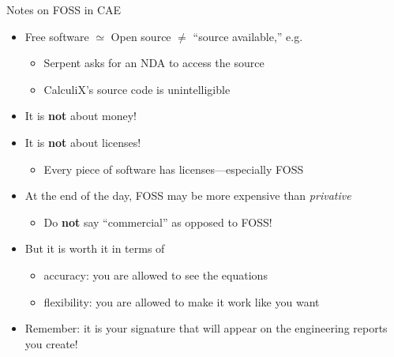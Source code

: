 \documentclass[
  ignorenonframetext,
  aspectratio=169,
]{beamer}
\providecommand{\tightlist}{%
  \setlength{\itemsep}{0pt}\setlength{\parskip}{0pt}}
\begin{document}
\begin{frame}{Notes on FOSS in CAE}
\protect\hypertarget{notes-on-foss-in-cae}{}
\begin{itemize}
\tightlist
\item
  Free software \(\simeq\) Open source \(\neq\) ``source available,''
  e.g.

  \begin{itemize}
  \tightlist
  \item
    Serpent asks for an NDA to access the source
  \item
    CalculiX's source code is unintelligible
  \end{itemize}
\item
  It is \textbf{not} about money!
\item
  It is \textbf{not} about licenses!

  \begin{itemize}
  \tightlist
  \item
    Every piece of software has licenses---especially FOSS
  \end{itemize}
\end{itemize}
\end{frame}

\begin{frame}
\begin{itemize}
\tightlist
\item
  At the end of the day, FOSS may be more expensive than
  \emph{privative}

  \begin{itemize}
  \tightlist
  \item
    Do \textbf{not} say ``commercial'' as opposed to FOSS!
  \end{itemize}
\item
  But it is worth it in terms of

  \begin{itemize}
  \tightlist
  \item
    accuracy: you are allowed to see the equations
  \item
    flexibility: you are allowed to make it work like you want
  \end{itemize}
\end{itemize}
\end{frame}

\begin{frame}
\begin{itemize}
\tightlist
\item
  Remember: it is your signature that will appear on the engineering
  reports you create!
\end{itemize}
\end{frame}
\end{document}
